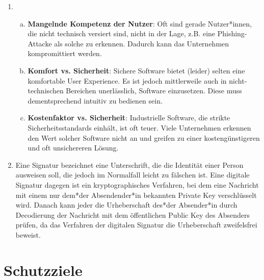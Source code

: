 \documentclass[a4paper,11pt]{scrartcl}
\begin{document}
\begin{enumerate}[1.]
    \item
        \begin{enumerate}[(a)]
            \item \textbf{Mangelnde Kompetenz der Nutzer}:
                  Oft sind gerade Nutzer*innen, die nicht technisch versiert sind,
                  nicht in der Lage, z.B. eine Phishing-Attacke als solche zu
                  erkennen. Dadurch kann das Unternehmen kompromittiert werden.
            \item \textbf{Komfort vs. Sicherheit}:
                  Sichere Software bietet (leider) selten eine komfortable
                  User Experience. Es ist jedoch mittlerweile auch in nicht-technischen
                  Bereichen unerlässlich, Software einzusetzen. Diese muss
                  dementsprechend intuitiv zu bedienen sein.
            \item \textbf{Kostenfaktor vs. Sicherheit}:
                  Industrielle Software, die strikte Sicherheitsstandards
                  einhält, ist oft teuer. Viele Unternehmen erkennen den Wert
                  solcher Software nicht an und greifen zu einer
                  kostengünstigeren und oft unsichereren Lösung.
        \end{enumerate}

    \item Eine Signatur bezeichnet eine Unterschrift, die die Identität einer Person
          ausweisen soll, die jedoch im Normalfall leicht zu fälschen ist. Eine
          digitale Signatur dagegen ist ein kryptographisches Verfahren, bei
          dem eine Nachricht mit einem nur dem*der Absendender*in bekannten
          Private Key verschlüsselt wird. Danach kann jeder die Urheberschaft
          des*der Absender*in durch Decodierung der Nachricht mit dem öffentlichen
          Public Key des Absenders prüfen, da das Verfahren der digitalen Signatur 
          die Urheberschaft zweifelsfrei beweist.
\end{enumerate}

\section{Schutzziele}
\end{document}
